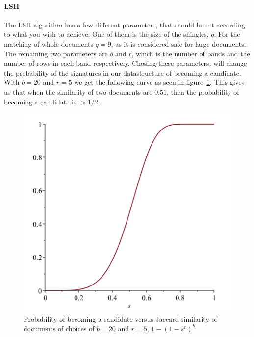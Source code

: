 \paragraph{LSH}

The LSH algorithm has a few different parameters, that should be set according to what you wish to achieve. One of them is the size of the shingles, $q$. For the matching of whole documents $q = 9$, as it is considered safe for large documents.\cite{leskovec2014mining}. %
The remaining two parameters are $b$ and $r$, which is the number of bands and the number of rows in each band respectively. Chosing these parameters, will change the probability of the signatures in our datastructure of becoming a candidate. With $b=20$ and $r=5$ we get the following curve as seen in figure~\ref{fig:lsh}. This gives us that when the similarity of two documents are $0.51$, then the probability of becoming a candidate is $>1/2$.

\begin{figure}[h]
	\centering
    \includegraphics[width = 0.4\linewidth]{docs/report/input/lsh.png}
    \captionsetup{width = \linewidth}
    \caption{Probability of becoming a candidate versus Jaccard similarity of documents of choices of $b=20$ and $r=5$, $1-(1-s^r)^b$}
    \label{fig:lsh}
\end{figure}

